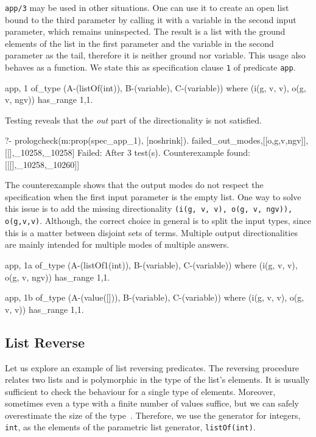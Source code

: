 \documentclass[runningheads,a4paper]{llncs}
\newcommand{\yap}[1]{\lstinline[style=yap]{#1}}
\begin{document}
\yap{app/3} may be used in other situations.
%
One can use it to create an open list bound to the third
parameter by calling it with a variable in the second input parameter,
which remains uninspected.
%
The result is a list with the ground elements of the list in the first
parameter and the variable in the second parameter as the tail,
therefore it is neither ground nor variable.
%
This usage also behaves as a function.
%
We state this as specification clause \yap{1} of predicate \yap{app}.
%
\begin{yapcode}
 {app, 1} of_type (A-(listOf(int)), B-(variable), C-(variable))
   where (i(g, v, v), o(g, v, ngv))  has_range {1,1}.
\end{yapcode}
%
Testing 
reveals that the \emph{out} part of
the directionality is not satisfied.
\begin{yapcode}
  ?- prologcheck(m:prop(spec_app_1), [noshrink]).
 {failed_out_modes,[[o,g,v,ngv]], [[],_10258,_10258]}
 Failed: After 3 test(s).
 Counterexample found: [[[],_10258,_10260]] 
\end{yapcode}
%
The counterexample shows that the output modes do not respect the
specification when the first input parameter is the empty
list.
%
One way to solve this issue is to add the missing directionality
\yap{(i(g, v, v), o(g, v, ngv)), o(g,v,v)}.
%
Although, the correct choice in general is to split the input types,
since this is a matter between disjoint sets of terms.
%
Multiple output directionalities are mainly intended for multiple modes
of multiple answers.
%
\begin{yapcode}
 {app, 1a} of_type (A-(listOf1(int)), B-(variable), C-(variable))
   where (i(g, v, v), o(g, v, ngv))  has_range {1,1}.

 {app, 1b} of_type (A-(value([])), B-(variable), C-(variable))
   where (i(g, v, v), o(g, v, v))  has_range {1,1}.
\end{yapcode}





\subsection{List Reverse}

Let us explore an example of list reversing predicates.
%
The reversing procedure relates two lists and is
polymorphic in the type of the list's elements.
%
It is usually sufficient to check the behaviour for a
single type of elements.
%
Moreover, sometimes even a type with a finite number of values suffice,
but we can safely overestimate the size of the
type~\cite{Bernardy-testing-poly-prop}.
%
Therefore, we use the generator for integers, \yap{int}, as the elements
of the parametric list generator, \yap{listOf(int)}.
\end{document}
